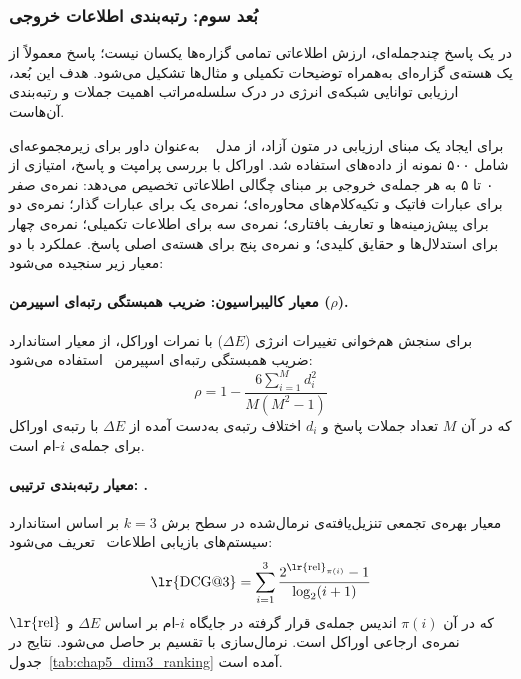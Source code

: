 \subsubsection{بُعد سوم: رتبه‌بندی اطلاعات خروجی}\label{sec:5-2-2-3}

در یک پاسخ چندجمله‌ای، ارزش اطلاعاتی تمامی گزاره‌ها یکسان نیست؛ پاسخ معمولاً از یک هسته‌ی گزاره‌ای به‌همراه توضیحات تکمیلی و مثال‌ها تشکیل می‌شود. هدف این بُعد، ارزیابی توانایی شبکه‌ی انرژی در درک سلسله‌مراتب اهمیت جملات و رتبه‌بندی آن‌هاست.

برای ایجاد یک مبنای ارزیابی در متون آزاد، از مدل ~\cite{comanici2025gemini25} به‌عنوان داور برای زیرمجموعه‌ای شامل ۵۰۰ نمونه از داده‌های  استفاده شد. اوراکل با بررسی پرامپت و پاسخ، امتیازی از ۰ تا ۵ به هر جمله‌ی خروجی بر مبنای چگالی اطلاعاتی تخصیص می‌دهد:
نمره‌ی صفر برای عبارات فاتیک و تکیه‌کلام‌های محاوره‌ای؛ نمره‌ی یک برای عبارات گذار؛ نمره‌ی دو برای پیش‌زمینه‌ها و تعاریف بافتاری؛ نمره‌ی سه برای اطلاعات تکمیلی؛ نمره‌ی چهار برای استدلال‌ها و حقایق کلیدی؛ و نمره‌ی پنج برای هسته‌ی اصلی پاسخ. عملکرد با دو معیار زیر سنجیده می‌شود:

\paragraph{معیار کالیبراسیون: ضریب همبستگی رتبه‌ای اسپیرمن ($\rho$).}
برای سنجش هم‌خوانی تغییرات انرژی ($\Delta E$) با نمرات اوراکل، از معیار استاندارد ضریب همبستگی رتبه‌ای اسپیرمن~\cite{spearman1904proof} استفاده می‌شود:
\begin{equation}
    \rho = 1 - \frac{6 \sum_{i=1}^{M} d_i^2}{M(M^2 - 1)} \label{eq:chap5_spearman}
\end{equation}
که در آن $M$ تعداد جملات پاسخ و $d_i$ اختلاف رتبه‌ی به‌دست آمده از $\Delta E$ با رتبه‌ی اوراکل برای جمله‌ی $i$-ام است.

\paragraph{معیار رتبه‌بندی ترتیبی: .}
معیار بهره‌ی تجمعی تنزیل‌یافته‌ی نرمال‌شده در سطح برش $k=3$ بر اساس استاندارد سیستم‌های بازیابی اطلاعات~\cite{jarvelin2002cumulated} تعریف می‌شود:
\begin{equation}
    \text{\lr{DCG@3}} = \sum_{i=1}^{3} \frac{2^{\text{\lr{rel}}_{\pi(i)}} - 1}{\log_2(i + 1)} \label{eq:chap5_dcg}
\end{equation}
که در آن $\pi(i)$ اندیس جمله‌ی قرار گرفته در جایگاه $i$-ام بر اساس $\Delta E$ و $\text{\lr{rel}}$ نمره‌ی ارجاعی اوراکل است. نرمال‌سازی با تقسیم بر  حاصل می‌شود. نتایج در جدول~\ref{tab:chap5_dim3_ranking} آمده است.

